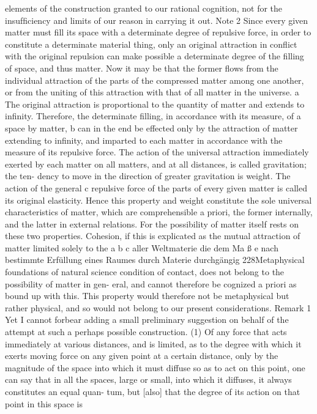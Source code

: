 elements of the construction granted to our rational cognition, not for
the insufﬁciency and limits of our reason in carrying it out.
Note 2
Since every given matter must ﬁll its space with a determinate degree of
repulsive force, in order to constitute a determinate material thing, only
an original attraction in conﬂict with the original repulsion can make
possible a determinate degree of the ﬁlling of space, and thus matter.
Now it may be that the former ﬂows from the individual attraction of
the parts of the compressed matter among one another, or from the
uniting of this attraction with that of all matter in the universe. a
The original attraction is proportional to the quantity of matter and
extends to inﬁnity. Therefore, the determinate ﬁlling, in accordance with
its measure, of a space by matter, b can in the end be effected only by the
attraction of matter extending to inﬁnity, and imparted to each matter
in accordance with the measure of its repulsive force.
The action of the universal attraction immediately exerted by each
matter on all matters, and at all distances, is called gravitation; the ten-
dency to move in the direction of greater gravitation is weight. The
action of the general c repulsive force of the parts of every given matter
is called its original elasticity. Hence this property and weight constitute
the sole universal characteristics of matter, which are comprehensible
a priori, the former internally, and the latter in external relations. For
the possibility of matter itself rests on these two properties. Cohesion, if
this is explicated as the mutual attraction of matter limited solely to the
a
b
c
aller Weltmaterie
die dem Ma ß e nach bestimmte Erfüllung eines Raumes durch Materie
durchgängig
228Metaphysical foundations of natural science
condition of contact, does not belong to the possibility of matter in gen-
eral, and cannot therefore be cognized a priori as bound up with this.
This property would therefore not be metaphysical but rather physical,
and so would not belong to our present considerations.
Remark 1
Yet I cannot forbear adding a small preliminary suggestion on behalf of
the attempt at such a perhaps possible construction.
(1) Of any force that acts immediately at various distances, and is
limited, as to the degree with which it exerts moving force on any given
point at a certain distance, only by the magnitude of the space into which
it must diffuse so as to act on this point, one can say that in all the spaces,
large or small, into which it diffuses, it always constitutes an equal quan-
tum, but [also] that the degree of its action on that point in this space is
